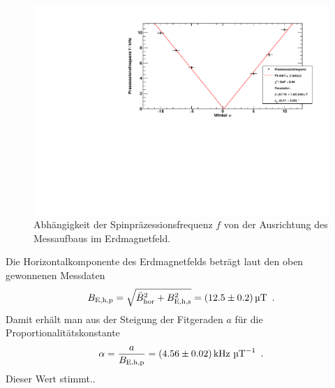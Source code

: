 \begin{figure}[H]
\begin{center}
  \includegraphics[width=\textwidth]{../img/part4/winkel.pdf}
  \caption{Abhängigkeit der Spinpräzessionsfrequenz $f$ von der Ausrichtung des Messaufbaus im Erdmagnetfeld.}
  \label{img:spp:Winkelabhängigkeit}
\end{center}
\end{figure} 

Die Horizontalkomponente des Erdmagnetfelds beträgt laut den oben gewonnenen Messdaten
\begin{equation}
  B_\text{E,h,p} = \sqrt{\bar{B}_\text{hor}^2+B_\text{E,h,s}^2}=(12.5 \pm 0.2)\,\text{\textmu T} \ \, .
\end{equation}
Damit erhält man aus der Steigung der Fitgeraden $a$ für die Proportionalitätskonstante
\begin{equation}
  \alpha = \frac{a}{B_\text{E,h,p}} = (4.56\pm0.02)\,\text{kHz } \text{\textmu T}^{-1} \ \, .
\end{equation}
Dieser Wert stimmt..
